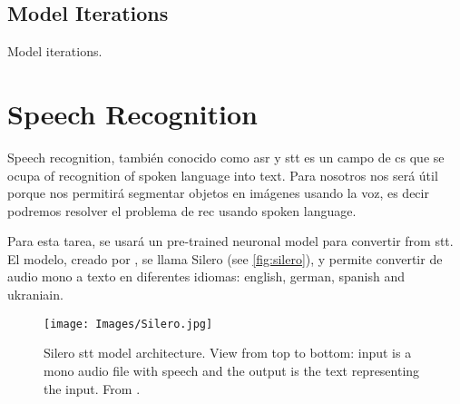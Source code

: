 \subsection{Model Iterations}\label{sec:model-iterations}

Model iterations.



\section{Speech Recognition}%
\label{sec:speech}

Speech recognition, también conocido como \gls{asr} y \gls{stt} es un campo de
\gls{cs} que se ocupa of recognition of spoken language into text. Para
nosotros nos será útil porque nos permitirá segmentar objetos en imágenes
usando la voz, es decir podremos resolver el problema de \gls{rec} usando
spoken language.

Para esta tarea, se usará un pre-trained neuronal model para convertir from
\gls{stt}. El modelo, creado por
, se llama Silero (see
\vref{fig:silero}), y permite convertir de audio mono a texto en diferentes
idiomas: english, german, spanish and ukraniain.

\begin{figure}[p]
  \centering
  \texttt{[image: Images/Silero.jpg]}
  \caption[Silero \gls*{stt} model architecture]{Silero \gls{stt} model
    architecture. View from top to bottom: input is a mono audio file with
    speech and the output is the text representing the
    input. From
    .}\label{fig:silero}
\end{figure}
